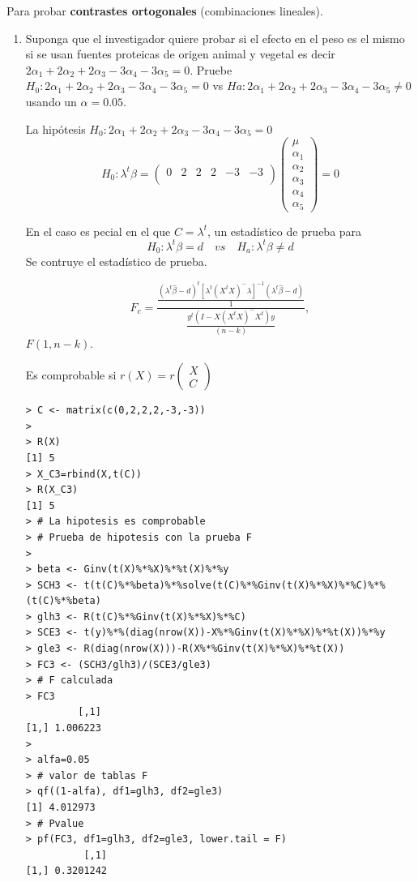 \documentclass[12pt,a4paper]{report}
\begin{document}

Para probar \textbf{contrastes ortogonales} (combinaciones lineales).

\begin{enumerate}
\item[c.] Suponga que el investigador quiere probar si el efecto en el peso es el mismo si se usan fuentes proteicas de origen animal y vegetal es decir $2\alpha_1+2\alpha_2+2\alpha_3-3\alpha_4-3\alpha_5 = 0$. Pruebe $H_0 :2\alpha_1+2\alpha_2+2\alpha_3-3\alpha_4-3\alpha_5 = 0$ vs $Ha : 2\alpha_1+2\alpha_2+2\alpha_3-3\alpha_4-3\alpha_5 \neq 0$ usando un $\alpha = 0.05$.


La hipótesis $H_0 :2\alpha_1+2\alpha_2+2\alpha_3-3\alpha_4-3\alpha_5 = 0$ 
\[H_0: \lambda^t\beta = \begin{pmatrix}
0 & 2 & 2 & 2 & -3 & -3 \\
\end{pmatrix}
\begin{pmatrix}
\mu \\ \alpha_1 \\ \alpha_2 \\ \alpha_3 \\ \alpha_4 \\ \alpha_5
\end{pmatrix} = 0\]

En el caso es pecial en el que $C=\lambda^t$,  un estadístico de prueba para 
\[H_0: \lambda^t\beta = d \quad vs \quad H_a: \lambda^t\beta \neq d\]
Se contruye el estadístico de prueba.

\[F_c = \frac{\frac{(\lambda^t\widehat{\beta}-d)^t[\lambda^t(X^tX)^{-}\lambda]^{-1}(\lambda^t\widehat{\beta}-d)}{1}}{\frac{y^t(I - X(X^tX)^{-}X^t)y}{(n-k)}},\]
 $F(1, n-k)$.

Es comprobable si $r(X)=r\begin{pmatrix} X \\ C \end{pmatrix}$


\begin{verbatim}
> C <- matrix(c(0,2,2,2,-3,-3))
> 
> R(X)
[1] 5
> X_C3=rbind(X,t(C))
> R(X_C3)             
[1] 5
> # La hipotesis es comprobable
> # Prueba de hipotesis con la prueba F
> 
> beta <- Ginv(t(X)%*%X)%*%t(X)%*%y
> SCH3 <- t(t(C)%*%beta)%*%solve(t(C)%*%Ginv(t(X)%*%X)%*%C)%*%(t(C)%*%beta)
> glh3 <- R(t(C)%*%Ginv(t(X)%*%X)%*%C)
> SCE3 <- t(y)%*%(diag(nrow(X))-X%*%Ginv(t(X)%*%X)%*%t(X))%*%y
> gle3 <- R(diag(nrow(X)))-R(X%*%Ginv(t(X)%*%X)%*%t(X))
> FC3 <- (SCH3/glh3)/(SCE3/gle3)
> # F calculada
> FC3                                        
         [,1]
[1,] 1.006223
> 
> alfa=0.05
> # valor de tablas F
> qf((1-alfa), df1=glh3, df2=gle3)             
[1] 4.012973
> # Pvalue
> pf(FC3, df1=glh3, df2=gle3, lower.tail = F)   
          [,1]
[1,] 0.3201242
\end{verbatim}




\end{enumerate}
\end{document}
